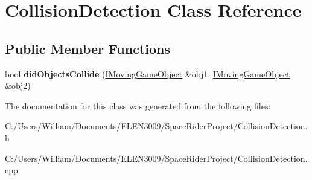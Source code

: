 \hypertarget{class_collision_detection}{}\section{Collision\+Detection Class Reference}
\label{class_collision_detection}
\subsection*{Public Member Functions}
\begin{DoxyCompactItemize}
\item 
\mbox{\label{class_collision_detection_a8e58e83acc7de60673126754ac2246cd}} 
bool {\bfseries did\+Objects\+Collide} (\hyperlink{class_i_moving_game_object}{I\+Moving\+Game\+Object} \&obj1, \hyperlink{class_i_moving_game_object}{I\+Moving\+Game\+Object} \&obj2)
\end{DoxyCompactItemize}


The documentation for this class was generated from the following files\+:\begin{DoxyCompactItemize}
\item 
C\+:/\+Users/\+William/\+Documents/\+E\+L\+E\+N3009/\+Space\+Rider\+Project/Collision\+Detection.\+h\item 
C\+:/\+Users/\+William/\+Documents/\+E\+L\+E\+N3009/\+Space\+Rider\+Project/Collision\+Detection.\+cpp\end{DoxyCompactItemize}
